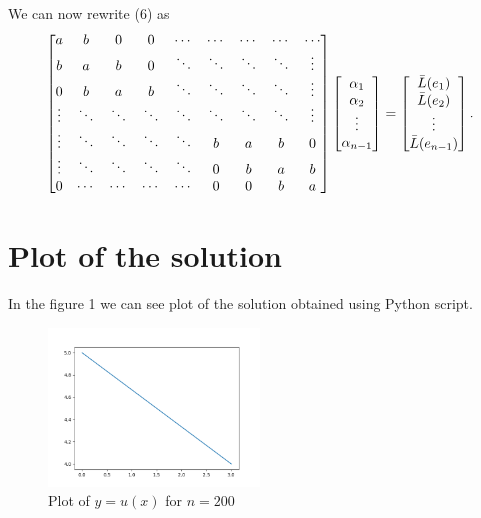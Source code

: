 \documentclass[12pt]{article}
\begin{document}
We can now rewrite (6) as
\begin{equation}
  \begin{bmatrix}
	a & b & 0 & 0 & \cdots & \cdots & \cdots &\cdots & \cdots \\
	b & a & b & 0 & \ddots & \ddots & \ddots & \ddots & \vdots \\
	0 & b & a & b & \ddots & \ddots &  \ddots & \ddots & \vdots \\
	\vdots & \ddots & \ddots & \ddots & \ddots & \ddots & \ddots & \ddots & \vdots \\
	\vdots & \ddots & \ddots & \ddots & \ddots & b & a & b & 0 \\
	\vdots & \ddots & \ddots & \ddots & \ddots & 0 & b & a & b \\
	0 & \cdots & \cdots & \cdots & \cdots & 0 & 0 & b & a
  \end{bmatrix}  
 \*
  \begin{bmatrix}
	\alpha_1 \\
	\alpha_2 \\
	\vdots \\
	\alpha_{n-1} \\
  \end{bmatrix}
=
  \begin{bmatrix}
	\bar L(e_1) \\
	\bar L(e_2) \\
	\vdots \\
	\bar L(e_{n-1}) \\
  \end{bmatrix}.
\end{equation}
 

\section{Plot of the solution}

In the figure 1 we can see plot of the solution obtained using Python script.

\begin{figure}[h]
    \centering
    \includegraphics[width=0.5\textwidth]{plot}
    \caption{Plot of $y=u(x)$ for $n=200$}
\end{figure}
\end{document}
